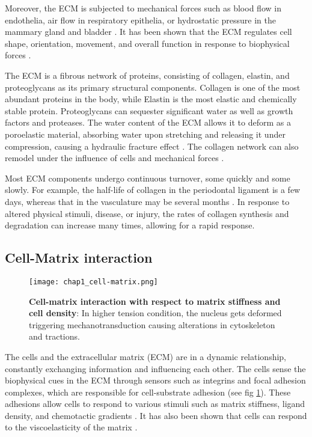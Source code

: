Moreover, the ECM is subjected to mechanical forces such as blood flow in endothelia, air flow in respiratory epithelia, or hydrostatic pressure in the mammary gland and bladder \cite{waters2012, walma2020}. It has been shown that the ECM regulates cell shape, orientation, movement, and overall function in response to biophysical forces \cite{alberts2015}.

The ECM is a fibrous network of proteins, consisting of collagen, elastin, and proteoglycans as its primary structural components. Collagen is one of the most abundant proteins in the body, while Elastin is the most elastic and chemically stable protein. Proteoglycans can sequester significant water as well as growth factors and proteases. The water content of the ECM allows it to deform as a poroelastic material, absorbing water upon stretching and releasing it under compression, causing a hydraulic fracture effect \cite{casares2015}. The collagen network can also remodel under the influence of cells and mechanical forces \cite{humphrey2014}.

Most ECM components undergo continuous turnover, some quickly and some slowly. For example, the half-life of collagen in the periodontal ligament is a few days, whereas that in the vasculature may be several months \cite{humphrey2014}. In response to altered physical stimuli, disease, or injury, the rates of collagen synthesis and degradation can increase many times, allowing for a rapid response.

\hypertarget{cell-matrix-interaction}{%
	\subsection{Cell-Matrix interaction}\label{cell-matrix-interaction}}

\begin{figure}
	\centering
	\texttt{[image: chap1\_cell-matrix.png]}
	\caption{\label{fig_1_4} \textbf{Cell-matrix interaction with respect to matrix stiffness and cell density}: In higher tension condition, the nucleus gets deformed triggering mechanotransduction causing alterations in cytoskeleton and tractions.\cite{xi2018}}
\end{figure}

The cells and the extracellular matrix (ECM) are in a dynamic relationship, constantly exchanging information and influencing each other. The cells sense the biophysical cues in the ECM through sensors such as integrins and focal adhesion complexes, which are responsible for cell-substrate adhesion \cite{kechagia2019} (see fig \ref{fig_1_4}). These adhesions allow cells to respond to various stimuli such as matrix stiffness, ligand density, and chemotactic gradients \cite{fortunato2022}. It has also been shown that cells can respond to the viscoelasticity of the matrix \cite{elosegui-artola2022}.

